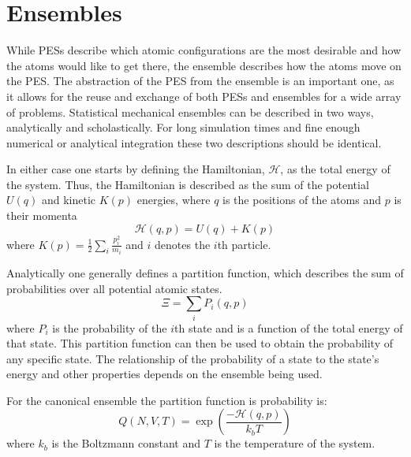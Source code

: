 \graphicspath{{./pes_e/figures/}}
\section{Ensembles} \label{sec:ens}
While PESs describe which atomic configurations are the most desirable and how the atoms would like to get there, the ensemble describes how the atoms move on the PES.
The abstraction of the PES from the ensemble is an important one, as it allows for the reuse and exchange of both PESs and ensembles for a wide array of problems.
Statistical mechanical ensembles can be described in two ways, analytically and scholastically.
For long simulation times and fine enough numerical or analytical integration these two descriptions should be identical.

In either case one starts by defining the Hamiltonian, $\mathcal{H}$, as the total energy of the system.
Thus, the Hamiltonian is described as the sum of the potential $U(q)$ and kinetic $K(p)$ energies, where $q$ is the positions of the atoms and $p$ is their momenta
\begin{equation} \label{Hamiltonian}
  \mathcal{H}(q, p) = U(q) + K(p)
\end{equation}
\noindent where $K(p) = \frac{1}{2}\sum_{i} \frac{p_{i}^{2}}{m_{i}}$ and $i$ denotes the $i$th particle.

Analytically one generally defines a partition function, which describes the sum of probabilities over all potential atomic states.
\begin{equation}
\Xi = \sum_{i} P_{i}(q, p)
\end{equation}
where $P_{i}$ is the probability of the $i$th state and is a function of the total energy of that state.
This partition function can then be used to obtain the probability of any specific state.
The relationship of the probability of a state to the state's energy and other properties depends on the ensemble being used.

For the canonical ensemble the partition function is probability is:
\begin{equation}
Q(N, V, T) = \exp(\frac{-\mathcal{H}(q, p)}{k_{b}T})
\end{equation}
where $k_{b}$ is the Boltzmann constant and $T$ is the temperature of the system. \cite{McQuarrie2000}

